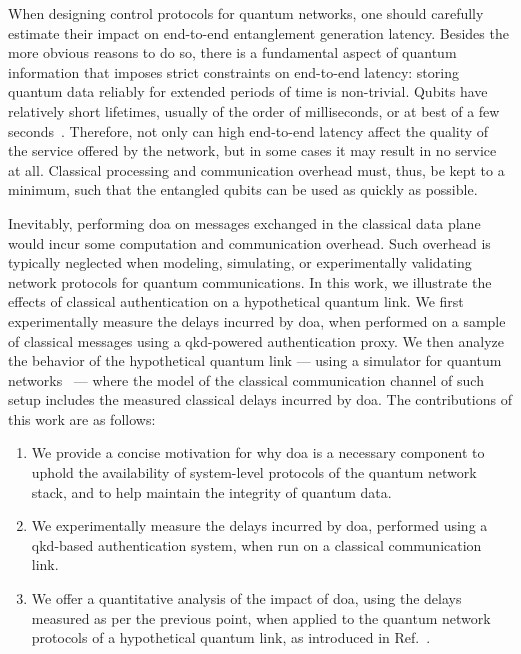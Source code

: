When designing control protocols for quantum networks, one should carefully estimate their impact on
end-to-end entanglement generation latency. Besides the more obvious reasons to do so, there is a
fundamental aspect of quantum information that imposes strict constraints on end-to-end latency:
storing quantum data reliably for extended periods of time is non-trivial. Qubits have relatively
short lifetimes, usually of the order of milliseconds, or at best of a few
seconds~\cite{abobeih_2018_one_sec, bradley_2019_one_min}. Therefore, not only can high end-to-end
latency affect the quality of the service offered by the network, but in some cases it may result in
no service at all. Classical processing and communication overhead must, thus, be kept to a minimum,
such that the entangled qubits can be used as quickly as possible.

Inevitably, performing \acrshort{doa} on messages exchanged in the classical data plane would incur
some computation and communication overhead. Such overhead is typically neglected when modeling,
simulating, or experimentally validating network protocols for quantum communications. In this work,
we illustrate the effects of classical authentication on a hypothetical quantum link. We first
experimentally measure the delays incurred by \acrshort{doa}, when performed on a sample of
classical messages using a \acrshort{qkd}-powered authentication proxy. We then analyze the behavior
of the hypothetical quantum link --- using a simulator for quantum
networks~\cite{coopmans_2021_netsquid} --- where the model of the classical communication channel of
such setup includes the measured classical delays incurred by \acrshort{doa}. The contributions of
this work are as follows:

\begin{enumerate}
    \item We provide a concise motivation for why \acrshort{doa} is a necessary component to uphold
          the availability of system-level protocols of the quantum network stack, and to help
          maintain the integrity of quantum data.
    \item We experimentally measure the delays incurred by \acrshort{doa}, performed using a
          \acrshort{qkd}-based authentication system, when run on a classical communication link.
    \item We offer a quantitative analysis of the impact of \acrshort{doa}, using the delays
          measured as per the previous point, when applied to the quantum network protocols of a
          hypothetical quantum link, as introduced in Ref.~\cite{dahlberg_2019_egp}.
\end{enumerate}

